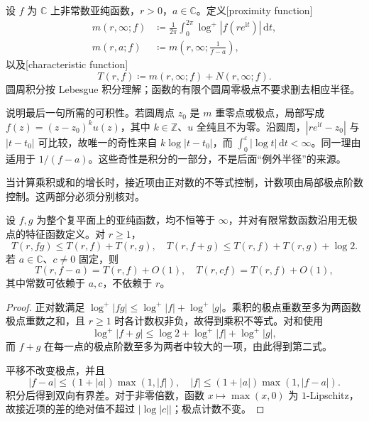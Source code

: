 \begin{definition}[接近函数与特征函数]\label{b3:def:C-characteristic}
设 \(f\) 为 \(\mathbb C\) 上非常数亚纯函数，\(r>0\)，\(a\in\mathbb C\)。定义[proximity function]
\[
 \begin{aligned}
 m(r,\infty;f)&\coloneqq\frac1{2\pi}\int_0^{2\pi}
                  \log^+|f(re^{\mathrm{i}t})|\,\mathrm{d}t,\\
 m(r,a;f)&\coloneqq m\left(r,\infty;\frac1{f-a}\right),
 \end{aligned}
\]
以及[characteristic function]
\[
 T(r,f)\coloneqq m(r,\infty;f)+N(r,\infty;f).
\]
圆周积分按 Lebesgue 积分理解；函数的有限个圆周零极点不要求删去相应半径。
\end{definition}

说明最后一句所需的可积性。若圆周点 \(z_0\) 是 \(m\) 重零点或极点，局部写成 \(f(z)=(z-z_0)^k u(z)\)，其中 \(k\in\mathbb Z\)、\(u\) 全纯且不为零。沿圆周，\(|re^{\mathrm{i}t}-z_0|\) 与 \(|t-t_0|\) 可比较，故唯一的奇性来自 \(k\log|t-t_0|\)，而
\(\int_0^\varepsilon|\log t|\,\mathrm{d}t<\infty\)。同一理由适用于 \(1/(f-a)\)。这些奇性是积分的一部分，不是后面“例外半径”的来源。

\ProseParagraphBreak

当计算乘积或和的增长时，接近项由正对数的不等式控制，计数项由局部极点阶数控制。这两部分必须分别核对。

\begin{proposition}[基本运算]\label{b3:prop:C-operations}
设 \(f,g\) 为整个复平面上的亚纯函数，均不恒等于 \(\infty\)，并对有限常数函数沿用无极点的特征函数定义。对 \(r\ge1\)，
\[
 T(r,fg)\le T(r,f)+T(r,g),
 \quad T(r,f+g)\le T(r,f)+T(r,g)+\log2.
\]
若 \(a\in\mathbb C\)、\(c\ne0\) 固定，则
\[
 T(r,f-a)=T(r,f)+O(1),
 \quad T(r,cf)=T(r,f)+O(1),
\]
其中常数可依赖于 \(a,c\)，不依赖于 \(r\)。
\end{proposition}
\begin{proof}
正对数满足 \(\log^+|fg|\le\log^+|f|+\log^+|g|\)。乘积的极点重数至多为两函数极点重数之和，且 \(r\ge1\) 时各计数权非负，故得到乘积不等式。对和使用
\[
 \log^+|f+g|\le\log2+\log^+|f|+\log^+|g|,
\]
而 \(f+g\) 在每一点的极点阶数至多为两者中较大的一项，由此得到第二式。

平移不改变极点，并且
\[
 |f-a|\le(1+|a|)\max(1,|f|),
 \quad |f|\le(1+|a|)\max(1,|f-a|).
\]
积分后得到双向有界差。对于非零倍数，函数 \(x\mapsto\max(x,0)\) 为 \(1\)-Lipschitz，故接近项的差的绝对值不超过 \(|\log|c||\)；极点计数不变。
\end{proof}

